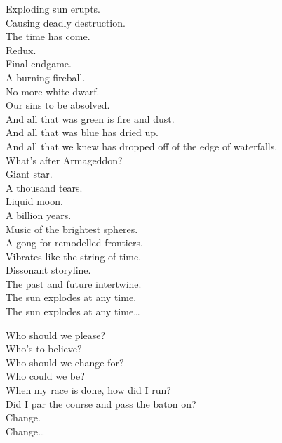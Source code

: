 Exploding sun erupts. \\
Causing deadly destruction. \\
The time has come. \\
Redux. \\
Final endgame. \\
A burning fireball. \\
No more white dwarf. \\
Our sins to be absolved. \\

And all that was green is fire and dust. \\
And all that was blue has dried up. \\
And all that we knew has dropped off of the edge of waterfalls. \\
What's after Armageddon? \\

Giant star. \\
A thousand tears. \\
Liquid moon. \\
A billion years. \\
Music of the brightest spheres. \\
A gong for remodelled frontiers. \\
Vibrates like the string of time. \\
Dissonant storyline. \\
The past and future intertwine. \\
The sun explodes at any time. \\

The sun explodes at any time… \\




Who should we please? \\
Who's to believe? \\
Who should we change for? \\
Who could we be? \\
When my race is done, how did I run? \\
Did I par the course and pass the baton on? \\

Change. \\
Change… \\
